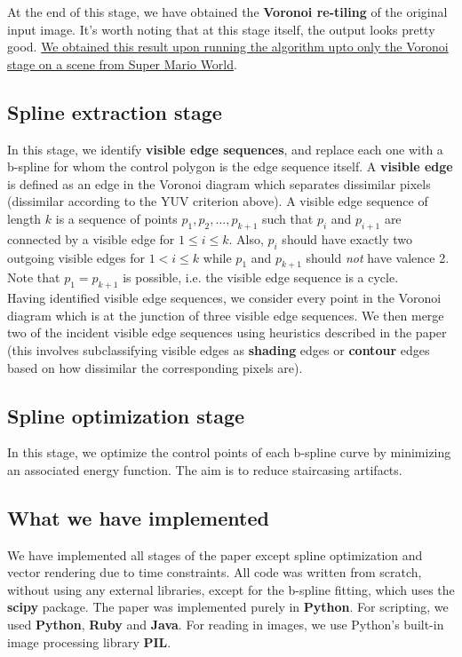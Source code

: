 \documentclass[a4paper,9pt]{article}
\begin{document}
At the end of this stage, we have obtained the \textbf{Voronoi re-tiling} of the original input image. It's worth noting that at this stage itself, the output looks pretty good. \href{https://www.youtube.com/watch?v=n4UP7V_Ev0g}{We obtained this result upon running the algorithm upto only the Voronoi stage on a scene from Super Mario World}.

\textcolor{myrust}{\subsection{Spline extraction stage}}

In this stage, we identify \textbf{visible edge sequences}, and replace each one with a b-spline for whom the control polygon is the edge sequence itself. A \textbf{visible edge} is defined as an edge in the Voronoi diagram which separates dissimilar pixels (dissimilar according to the YUV criterion above). A visible edge sequence of length $k$ is a sequence of points $p_1, p_2, ..., p_{k+1}$ such that $p_i$ and $p_{i+1}$ are connected by a visible edge for $1 \le i \le k$. Also, $p_i$ should have exactly two outgoing visible edges for $1 < i \le k$ while $p_1$ and $p_{k+1}$ should \textit{not} have valence 2. Note that $p_1 = p_{k+1}$ is possible, i.e. the visible edge sequence is a cycle.\\

Having identified visible edge sequences, we consider every point in the Voronoi diagram which is at the junction of three visible edge sequences. We then merge two of the incident visible edge sequences using heuristics described in the paper (this involves subclassifying visible edges as \textbf{shading} edges or \textbf{contour} edges based on how dissimilar the corresponding pixels are).

\textcolor{myrust}{\subsection{Spline optimization stage}}

In this stage, we optimize the control points of each b-spline curve by minimizing an associated energy function. The aim is to reduce staircasing artifacts.

\textcolor{myrust}{\section{What we have implemented}}

We have implemented all stages of the paper except spline optimization and vector rendering due to time constraints. All code was written from scratch, without using any external libraries, except for the b-spline fitting, which uses the \textbf{scipy} package. The paper was implemented purely in \textbf{Python}. For scripting, we used \textbf{Python}, \textbf{Ruby} and \textbf{Java}. For reading in images, we use Python's built-in image processing library \textbf{PIL}.
\end{document}

